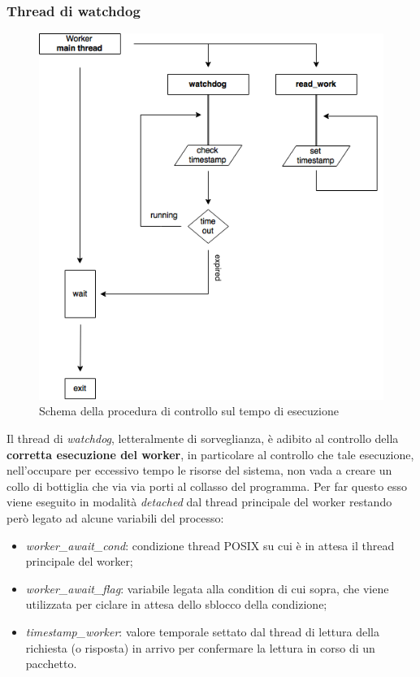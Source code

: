 \documentclass[italian]{tktltiki2}
\begin{document}
\subsubsection{Thread di watchdog}
\label{sec:watchdog}
\begin{figure}[h]
\centering
\includegraphics[width=\textwidth]{images/watchdog}
\caption{Schema della procedura di controllo sul tempo di esecuzione \label{fig: watchdog}}
\end{figure}
Il thread di \emph{watchdog}, letteralmente di sorveglianza, è adibito al controllo della \textbf{corretta esecuzione del worker}, in particolare al controllo che tale esecuzione, nell'occupare per eccessivo tempo le risorse del sistema, non vada a creare un collo di bottiglia che via via porti al collasso del programma. Per far questo esso viene eseguito in modalità \emph{detached} dal thread principale del worker restando però legato ad alcune variabili del processo: 
\begin{itemize}
	\item \emph{worker\_await\_cond}: condizione thread POSIX su cui è in attesa il thread principale del worker;
	\item \emph{worker\_await\_flag}: variabile legata alla condition di cui sopra, che viene utilizzata per ciclare in attesa dello sblocco della condizione;
	\item \emph{timestamp\_worker}: valore temporale settato dal thread di lettura della richiesta (o risposta) in arrivo per confermare la lettura in corso di un pacchetto.
\end{itemize}
\end{document}
